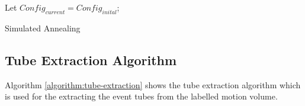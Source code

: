 \documentclass[conference]{IEEEtran}
\begin{document}
    \begin{algorithm}
        \SetAlgoLined
        Let \(Config_{current} = Config_{inital}\);
        \caption{Simulated Annealing}
        \label{algorithm:simulated-annealing}
    \end{algorithm}

    \subsection{Tube Extraction Algorithm}
    Algorithm \ref{algorithm:tube-extraction} shows the tube extraction algorithm
    which is used for the extracting the event tubes from the labelled motion
    volume.
\end{document}
